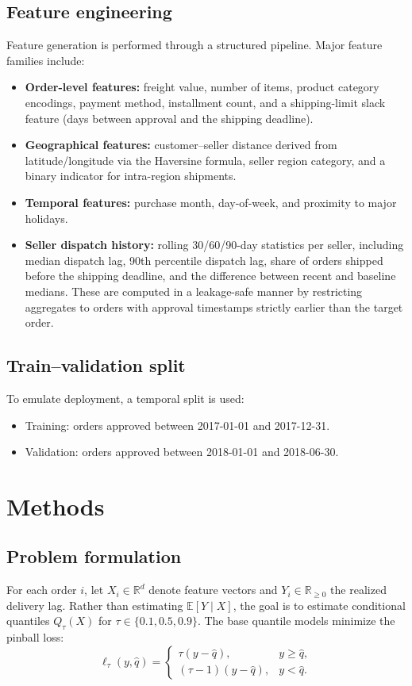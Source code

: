 \documentclass[10pt,twocolumn]{article}
\begin{document}
\subsection{Feature engineering}
Feature generation is performed through a structured pipeline. Major feature families include:
\begin{itemize}
  \item \textbf{Order-level features:} freight value, number of items, product category encodings, payment method, installment count, and a shipping-limit slack feature (days between approval and the shipping deadline).
  \item \textbf{Geographical features:} customer--seller distance derived from latitude/longitude via the Haversine formula, seller region category, and a binary indicator for intra-region shipments.
  \item \textbf{Temporal features:} purchase month, day-of-week, and proximity to major holidays.
  \item \textbf{Seller dispatch history:} rolling 30/60/90-day statistics per seller, including median dispatch lag, 90th percentile dispatch lag, share of orders shipped before the shipping deadline, and the difference between recent and baseline medians. These are computed in a leakage-safe manner by restricting aggregates to orders with approval timestamps strictly earlier than the target order.
\end{itemize}

\subsection{Train--validation split}
To emulate deployment, a temporal split is used:
\begin{itemize}
  \item Training: orders approved between 2017-01-01 and 2017-12-31.
  \item Validation: orders approved between 2018-01-01 and 2018-06-30.
\end{itemize}

\section{Methods}
\subsection{Problem formulation}
For each order $i$, let $X_i \in \mathbb{R}^d$ denote feature vectors and $Y_i \in \mathbb{R}_{\ge 0}$ the realized delivery lag. Rather than estimating $\mathbb{E}[Y \mid X]$, the goal is to estimate conditional quantiles $Q_\tau(X)$ for $\tau \in \{0.1, 0.5, 0.9\}$. The base quantile models minimize the pinball loss:
\begin{equation}
  \ell_\tau(y,\hat{q}) = 
  \begin{cases}
    \tau (y - \hat{q}), & y \ge \hat{q},\\[2pt]
    (\tau - 1)(y - \hat{q}), & y < \hat{q}.
  \end{cases}
\end{equation}
\end{document}
